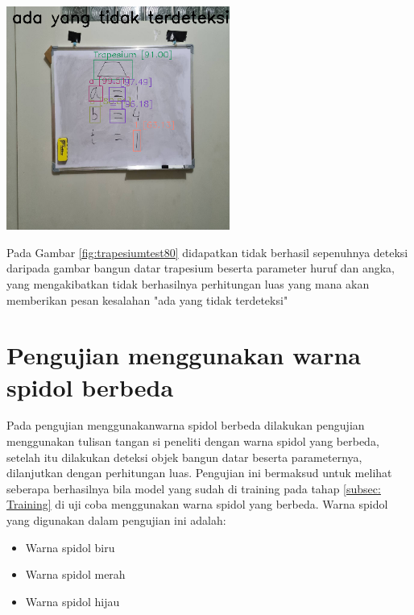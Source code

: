 \begin{center}
	\includegraphics[width=0.55\textwidth]{gambar/trap80hasil.png}
	\label{fig:trapesiumtest80}
\end{center}
Pada Gambar \ref{fig:trapesiumtest80} didapatkan tidak berhasil sepenuhnya deteksi daripada gambar bangun datar trapesium beserta parameter huruf dan angka, yang mengakibatkan tidak berhasilnya perhitungan luas yang mana akan memberikan pesan kesalahan "ada yang tidak terdeteksi"

\section{Pengujian menggunakan warna spidol berbeda}
Pada pengujian menggunakanwarna spidol berbeda dilakukan pengujian menggunakan tulisan tangan si peneliti dengan warna spidol yang berbeda, setelah itu dilakukan deteksi objek bangun datar beserta parameternya, dilanjutkan dengan perhitungan luas. Pengujian ini bermaksud untuk melihat seberapa berhasilnya bila model yang sudah di training pada tahap \ref{subsec: Training} di uji coba menggunakan warna spidol yang berbeda. Warna spidol yang digunakan dalam pengujian ini adalah:
\begin{itemize}
	\item Warna spidol biru
	\item Warna spidol merah
	\item Warna spidol hijau
\end{itemize}


